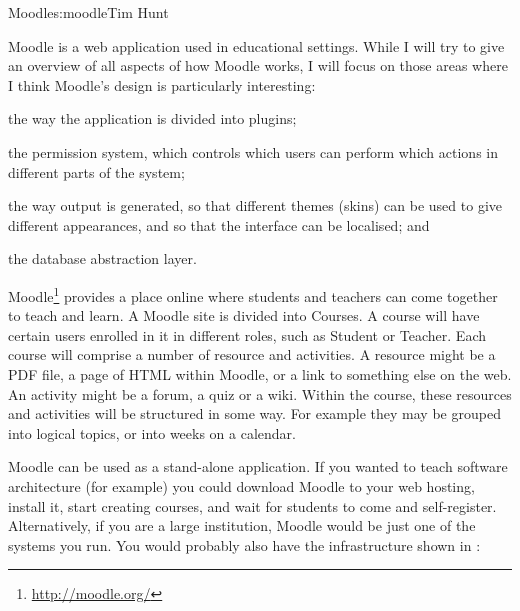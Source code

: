 \begin{aosachapter}{Moodle}{s:moodle}{Tim Hunt}

Moodle is a web application used in educational settings. While I will
try to give an overview of all aspects of how Moodle works, I will
focus on those areas where I think Moodle's design is particularly
interesting:

\begin{aosaenumerate}

\item the way the application is divided into plugins;

\item the permission system, which controls which users can perform
  which actions in different parts of the system;

\item the way output is generated, so that different themes (skins)
  can be used to give different appearances, and so that the interface
  can be localised; and

\item the database abstraction layer.

\end{aosaenumerate}

Moodle\footnote{\url{http://moodle.org/}} provides a place online
where students and teachers can come together to teach and learn. A
Moodle site is divided into Courses. A course will have certain users
enrolled in it in different roles, such as Student or Teacher. Each
course will comprise a number of resource and activities. A resource
might be a PDF file, a page of HTML within Moodle, or a link to
something else on the web. An activity might be a forum, a quiz or a
wiki. Within the course, these resources and activities will be
structured in some way. For example they may be grouped into logical
topics, or into weeks on a calendar.


Moodle can be used as a stand-alone application. If you wanted to
teach software architecture (for example) you could download Moodle to
your web hosting, install it, start creating courses, and wait for
students to come and self-register. Alternatively, if you are a large
institution, Moodle would be just one of the systems you run. You
would probably also have the infrastructure shown in
:



\end{aosachapter}
